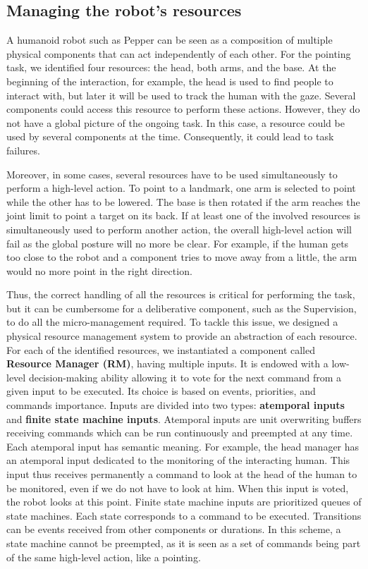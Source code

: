 \subsection{Managing the robot's resources}

A humanoid robot such as Pepper can be seen as a composition of multiple physical components that can act independently of each other. For the pointing task, we identified four resources: the head, both arms, and the base. At the beginning of the interaction, for example, the head is used to find people to interact with, but later it will be used to track the human with the gaze. Several components could access this resource to perform these actions. However, they do not have a global picture of the ongoing task. In this case, a resource could be used by several components at the time. Consequently, it could lead to task failures.

Moreover, in some cases, several resources have to be used simultaneously to perform a high-level action. To point to a landmark, one arm is selected to point while the other has to be lowered. The base is then rotated if the arm reaches the joint limit to point a target on its back. If at least one of the involved resources is simultaneously used to perform another action, the overall high-level action will fail as the global posture will no more be clear. For example, if the human gets too close to the robot and a component tries to move away from a little, the arm would no more point in the right direction.

Thus, the correct handling of all the resources is critical for performing the task, but it can be cumbersome for a deliberative component, such as the Supervision, to do all the micro-management required. To tackle this issue, we designed a physical resource management system to provide an abstraction of each resource. For each of the identified resources, we instantiated a component called \textbf{Resource Manager (RM)}, having multiple inputs. It is endowed with a low-level decision-making ability allowing it to vote for the next command from a given input to be executed. Its choice is based on events, priorities, and commands importance. Inputs are divided into two types: \textbf{atemporal inputs} and \textbf{finite state machine inputs}. Atemporal inputs are unit overwriting buffers receiving commands which can be run continuously and preempted at any time. Each atemporal input has semantic meaning. For example, the head manager has an atemporal input dedicated to the monitoring of the interacting human. This input thus receives permanently a command to look at the head of the human to be monitored, even if we do not have to look at him. When this input is voted, the robot looks at this point. Finite state machine inputs are prioritized queues of state machines. Each state corresponds to a command to be executed. Transitions can be events received from other components or durations. In this scheme, a state machine cannot be preempted, as it is seen as a set of commands being part of the same high-level action, like a pointing.

